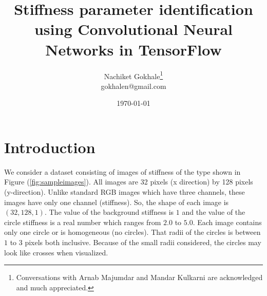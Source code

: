 \documentclass{article}
\begin{document}
\title{Stiffness parameter identification using Convolutional Neural Networks in TensorFlow}
\author{Nachiket Gokhale\footnote{Conversations with Arnab Majumdar and Mandar Kulkarni are acknowledged and much appreciated.}\\gokhalen@gmail.com}
\date{\today}
\maketitle
\section{Introduction}
We consider a dataset consisting of images of stiffness of the type shown in Figure (\ref{fig:sampleimages}). All images are 32 pixels (x direction) by 128 pixels (y-direction). Unlike standard RGB images which have three channels, these images have only one channel (stiffness). So, the shape of each image is $(32,128,1)$. The value of the background stiffness is $1$ and the value of the circle stiffness is a real number which ranges from $2.0$ to $5.0$. Each image contains only one circle or is homogeneous (no circles). That radii of the circles is between $1$ to $3$ pixels both inclusive. Because of the small radii considered, the circles may look like crosses when visualized.\\
\end{document}
